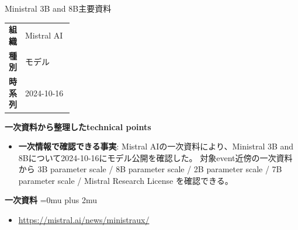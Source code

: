 \begin{technicalnote}{Ministral 3B and 8B}{主要資料}
\begingroup
\begin{tabularx}{\linewidth}{@{}>{\bfseries}p{0.22\linewidth}X@{}}
組織 & Mistral AI \\
種別 & モデル \\
時系列 & 2024-10-16 \\
\end{tabularx}
\smallskip
{\bfseries 一次資料から整理したtechnical points}
\begin{itemize}[leftmargin=1.5em,itemsep=0.35em]
\item \textbf{一次情報で確認できる事実}: Mistral AIの一次資料により、Ministral 3B and 8Bについて2024-10-16にモデル公開を確認した。 対象event近傍の一次資料から 3B parameter scale / 8B parameter scale / 2B parameter scale / 7B parameter scale / Mistral Research License を確認できる。
\end{itemize}
\begin{minipage}{\linewidth}
\begin{samepage}
{\bfseries 一次資料}
\begingroup\sloppy
\Urlmuskip=0mu plus 2mu\relax
\begin{itemize}[leftmargin=1.5em,itemsep=0.25em]
\item {\scriptsize\url{https://mistral.ai/news/ministraux/}}
\end{itemize}
\endgroup
\end{samepage}
\end{minipage}
\endgroup
\end{technicalnote}
\medskip

